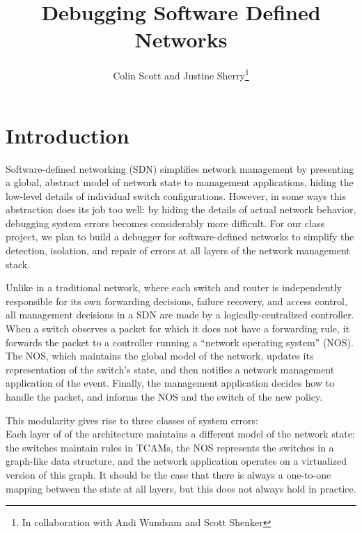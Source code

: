 \documentclass{sig-alternate-10pt}
\title{Debugging Software Defined Networks\vspace{-25pt}}
\author{Colin Scott and Justine Sherry\thanks{In collaboration with Andi
Wundsam and Scott Shenker}\vspace{-15pt}}
\date{}
\begin{document}
    \maketitle
    \thispagestyle{empty}
%
%
%
%  

\section{Introduction}
Software-defined networking (SDN) simplifies network management by presenting a
global, abstract model of network state to management applications, hiding
the low-level details of individual switch configurations. However, in some ways this abstraction does
its job too well: by hiding the details of actual network behavior, debugging
system errors becomes considerably more difficult.
For our class project, we plan to build a debugger for software-defined networks to
simplify the detection, isolation, and repair of errors at all layers of
the network management stack.

Unlike in a traditional network, where each switch and router is independently responsible for
its own forwarding decisions, failure recovery, and access control, all management
decisions in a SDN are made by a logically-centralized controller. When a
switch observes a packet for which it does not have a forwarding rule,
it forwards the packet to a controller running a ``network operating system''
(NOS). The NOS, which maintains the global model of the network, updates its representation
of the switch's state, and then notifies a network management application of the event.
Finally, the management application decides how to handle the packet, and informs the NOS
and the switch of the new policy.

This modularity gives rise to three classes of system errors: \\
Each layer of of the architecture maintains a different model of the network state: the
switches maintain rules in TCAMs, the NOS represents the switches
in a graph-like data structure, and the network application operates on 
a virtualized version of this graph. It should be
the case that there is always a one-to-one mapping between the state at all
layers, but this does not always hold in practice.
\end{document}
